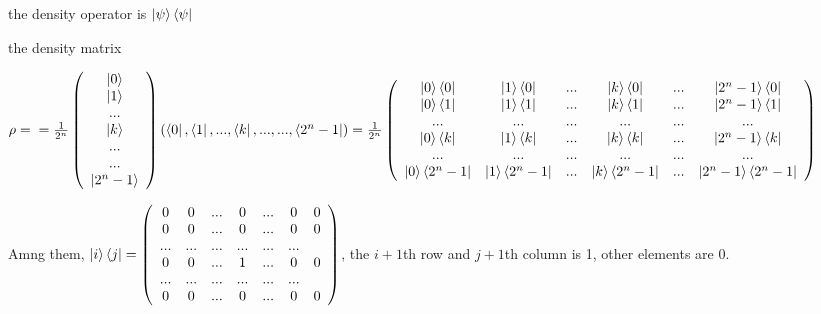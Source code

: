 \documentclass{article}
\begin{document}
\begin{enumerate}
          the density operator is $\ket{\psi}\bra{\psi}$

          the density matrix

          $\rho=
              \\=\frac{1}{2^n}\left(\begin{array}{c}
                  \ket{0} \\\ket{1}\\...\\\ket{k}\\...\\...\\\ket{2^n-1}
              \end{array}\right)(\bra{0},\bra{1},...,\bra{k},...,...,\bra{2^n-1})
              \\=\frac{1}{2^n}\left(\begin{array}{cccccc}
                      \ket{0}\bra{0}     & \ket{1}\bra{0}     & ... & \ket{k}\bra{0}     & ... & \ket{2^n-1}\bra{0}     \\
                      \ket{0}\bra{1}     & \ket{1}\bra{1}     & ... & \ket{k}\bra{1}     & ... & \ket{2^n-1}\bra{1}     \\
                      ...                & ...                & ... & ...                & ... & ...                    \\
                      \ket{0}\bra{k}     & \ket{1}\bra{k}     & ... & \ket{k}\bra{k}     & ... & \ket{2^n-1}\bra{k}     \\
                      ...                & ...                & ... & ...                & ... & ...                    \\
                      \ket{0}\bra{2^n-1} & \ket{1}\bra{2^n-1} & ... & \ket{k}\bra{2^n-1} & ... & \ket{2^n-1}\bra{2^n-1} \\
                  \end{array}\right)
          $

          Amng them, $\ket{i}\bra{j}=\left(\begin{array}{ccccccc}
                      0   & 0   & ... & 0   & ... & 0   & 0 \\
                      0   & 0   & ... & 0   & ... & 0   & 0 \\
                      ... & ... & ... & ... & ... & ...     \\
                      0   & 0   & ... & 1   & ... & 0   & 0 \\
                      ... & ... & ... & ... & ... & ...     \\
                      0   & 0   & ... & 0   & ... & 0   & 0 \\
                  \end{array}\right)$, the $i+1$th row and $j+1$th column is 1, other elements are 0.
\end{enumerate}
\end{document}
